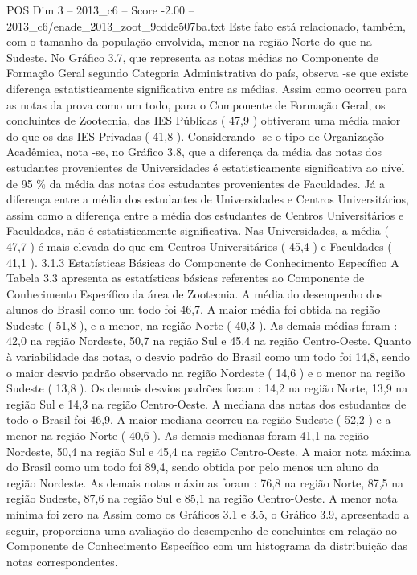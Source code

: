 \begin{textsample}{POS Dim 3 – 2013\_c6 – Score -2.00 – 2013\_c6/enade\_2013\_zoot\_9cdde507ba.txt}
Este fato está relacionado, também, com o tamanho da população envolvida, menor na região Norte do que na Sudeste.
No Gráfico 3.7, que representa as notas médias no Componente de Formação Geral segundo Categoria Administrativa do país, observa -se que existe diferença estatisticamente significativa entre as médias.
Assim como ocorreu para as notas da prova como um todo, para o Componente de Formação Geral, os concluintes de Zootecnia, das IES Públicas ( 47,9 ) obtiveram uma média maior do que os das IES Privadas ( 41,8 ).
Considerando -se o tipo de Organização Acadêmica, nota -se, no Gráfico 3.8, que a diferença da média das notas dos estudantes provenientes de Universidades é estatisticamente significativa ao nível de 95 \% da média das notas dos estudantes provenientes de Faculdades.
Já a diferença entre a média dos estudantes de Universidades e Centros Universitários, assim como a diferença entre a média dos estudantes de Centros Universitários e Faculdades, não é estatisticamente significativa.
Nas Universidades, a média ( 47,7 ) é mais elevada do que em Centros Universitários ( 45,4 ) e Faculdades ( 41,1 ). 3.1.3 Estatísticas Básicas do Componente de Conhecimento Específico A Tabela 3.3 apresenta as estatísticas básicas referentes ao Componente de Conhecimento Específico da área de Zootecnia.
A média do desempenho dos alunos do Brasil como um todo foi 46,7.
A maior média foi obtida na região Sudeste ( 51,8 ), e a menor, na região Norte ( 40,3 ).
As demais médias foram : 42,0 na região Nordeste, 50,7 na região Sul e 45,4 na região Centro-Oeste.
Quanto à variabilidade das notas, o desvio padrão do Brasil como um todo foi 14,8, sendo o maior desvio padrão observado na região Nordeste ( 14,6 ) e o menor na região Sudeste ( 13,8 ).
Os demais desvios padrões foram : 14,2 na região Norte, 13,9 na região Sul e 14,3 na região Centro-Oeste.
A mediana das notas dos estudantes de todo o Brasil foi 46,9.
A maior mediana ocorreu na região Sudeste ( 52,2 ) e a menor na região Norte ( 40,6 ).
As demais medianas foram 41,1 na região Nordeste, 50,4 na região Sul e 45,4 na região Centro-Oeste.
A maior nota máxima do Brasil como um todo foi 89,4, sendo obtida por pelo menos um aluno da região Nordeste.
As demais notas máximas foram : 76,8 na região Norte, 87,5 na região Sudeste, 87,6 na região Sul e 85,1 na região Centro-Oeste.
A menor nota mínima foi zero na Assim como os Gráficos 3.1 e 3.5, o Gráfico 3.9, apresentado a seguir, proporciona uma avaliação do desempenho de concluintes em relação ao Componente de Conhecimento Específico com um histograma da distribuição das notas correspondentes.

\end{textsample}
